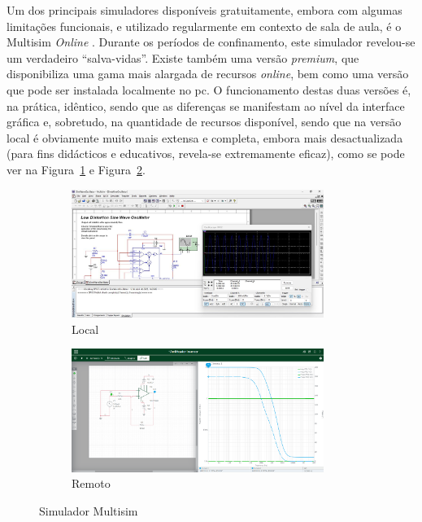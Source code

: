 Um dos principais simuladores disponíveis gratuitamente, embora com algumas limitações funcionais, e utilizado regularmente em contexto de sala de aula, é o Multisim \textit{Online} \cite{multisim}. Durante os períodos de confinamento, este simulador revelou-se um verdadeiro ``salva-vidas''. Existe também uma versão \textit{premium}, que disponibiliza uma gama mais alargada de recursos \textit{online}, bem como uma versão que pode ser instalada localmente no \acrshort{pc}. O funcionamento destas duas versões é, na prática, idêntico, sendo que as diferenças se manifestam ao nível da interface gráfica e, sobretudo, na quantidade de recursos disponível, sendo que na versão local é obviamente muito mais extensa e completa, embora mais desactualizada (para fins didácticos e educativos, revela-se extremamente eficaz), como se pode ver na Figura~\ref{fig:multisimlocal} e Figura~\ref{fig:multisimremoto}.

\begin{figure}[hbtp]
    \centering
    \begin{subfigure}[hbtp]{0.48\textwidth}
        \centering
        \includegraphics[width=0.9\textwidth]{figures/Multisim_Desktop.png}
        \caption{Local}
        \label{fig:multisimlocal}
    \end{subfigure}
    \begin{subfigure}[hbtp]{0.48\textwidth}
        \includegraphics[width=0.9\textwidth]{figures/Multisim_ACsweep.png}
        \caption{Remoto}
        \label{fig:multisimremoto}
    \end{subfigure}
    \caption{Simulador Multisim}
    \label{fig:multisimsimulator}
\end{figure}

